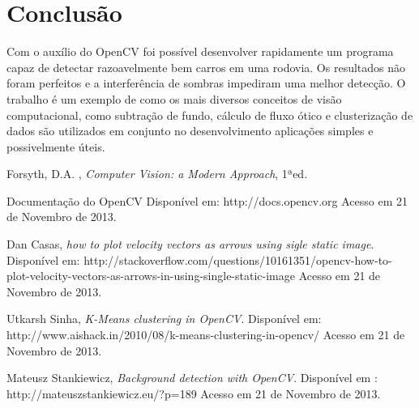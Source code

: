 \documentclass[journal]{IEEEtran}
\begin{document}
\section{Conclusão}

Com o auxílio do OpenCV foi possível desenvolver rapidamente um programa capaz
de detectar razoavelmente bem carros em uma rodovia. Os resultados não foram 
perfeitos e a interferência de sombras impediram uma melhor detecção. O trabalho
é um exemplo de como os mais diversos conceitos de visão computacional, como
subtração de fundo, cálculo de fluxo ótico e clusterização de dados são utilizados
em conjunto no desenvolvimento aplicações simples e possivelmente úteis.

\newpage

\begin{thebibliography}{1}

Forsyth, D.A. , \emph{Computer Vision: a Modern Approach}, 1ªed.

 Documentação do OpenCV
 Disponível em: http://docs.opencv.org
	 Acesso em 21 de Novembro de 2013.

    Dan Casas, \emph{how to plot velocity vectors as arrows using
                       sigle static image}.
    Disponível em: http://stackoverflow.com/questions/10161351/opencv-how-to-plot-velocity-vectors-as-arrows-in-using-single-static-image
    Acesso em 21 de Novembro de 2013.

    Utkarsh Sinha, \emph{K-Means clustering in OpenCV}.
    Disponível em: http://www.aishack.in/2010/08/k-means-clustering-in-opencv/
    Acesso em 21 de Novembro de 2013.

    Mateusz Stankiewicz, \emph{Background detection with OpenCV}.
    Disponível em : http://mateuszstankiewicz.eu/?p=189
    Acesso em 21 de Novembro de 2013. 
\end{thebibliography}
\end{document}
